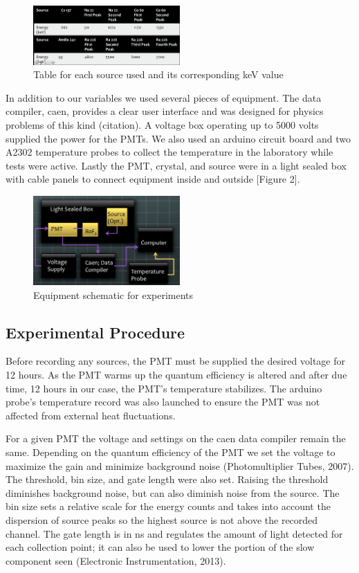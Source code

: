 \documentclass{article}
\begin{document}
\begin{figure}
  \centering
    \includegraphics[width=0.5\textwidth]{knownkev.png}
  \caption{Table for each source used and its corresponding keV value}
  \label{fig:workflowedge}
\end{figure} 

In addition to our variables we used several pieces of equipment. The data compiler, caen, provides a clear user interface and was designed for physics problems of this kind (citation). A voltage box operating up to 5000 volts supplied the power for the PMTs. We also used an arduino circuit board and two A2302 temperature probes to collect the temperature in the laboratory while tests were active. Lastly the PMT, crystal, and source were in a light sealed box with cable panels to connect equipment inside and outside [Figure 2]. 

\begin{figure}
  \centering
    \includegraphics[width=0.5\textwidth]{schem.png}
  \caption{Equipment schematic for experiments}
  \label{fig:workflowedge}
\end{figure} 


\subsection{Experimental Procedure}

Before recording any sources, the PMT must be supplied the desired voltage for 12 hours. As the PMT warms up the quantum efficiency is altered and after due time, 12 hours in our case, the PMT's temperature stabilizes. The arduino probe's temperature record was also launched to ensure the PMT was not affected from external heat fluctuations. 

For a given PMT the voltage and settings on the caen data compiler remain the same. Depending on the quantum efficiency of the PMT we set the voltage to maximize the gain and minimize background noise (Photomultiplier Tubes, 2007). The threshold, bin size, and gate length were also set. Raising the threshold diminishes background noise, but can also diminish noise from the source. The bin size sets a relative scale for the energy counts and takes into account the dispersion of source peaks so the highest source is not above the recorded channel. The gate length is in ns and regulates the amount of light detected for each collection point; it can also be used to lower the portion of the slow component seen (Electronic Instrumentation, 2013). 
\end{document}
